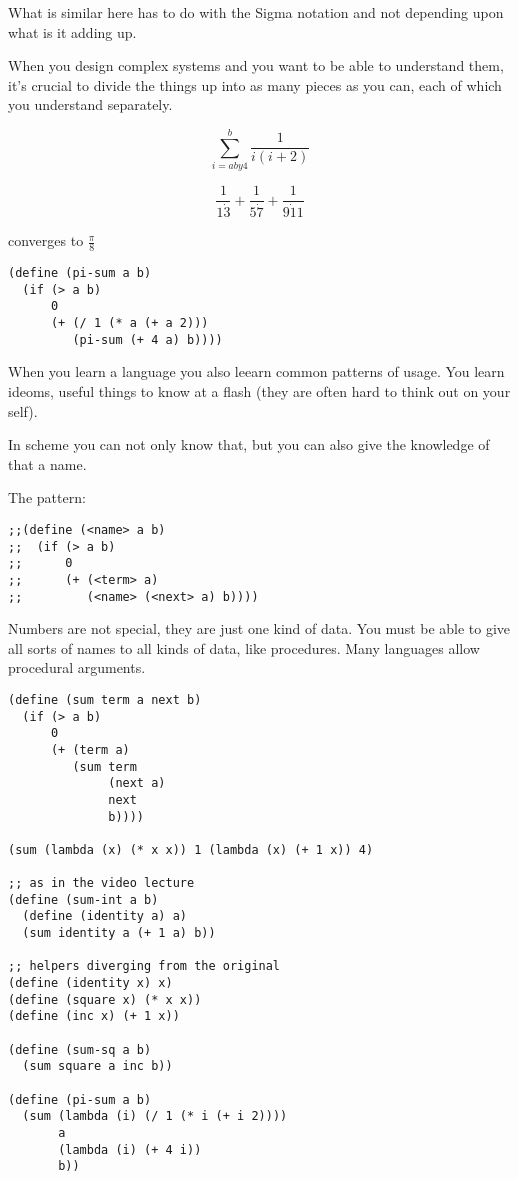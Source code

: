 \documentclass[11pt]{article}
\begin{document}
What is similar here has to do with the Sigma notation and not depending
upon what is it adding up.

When you design complex systems and you want to be able to understand them,
it's crucial to divide the things up into as many pieces as you can, each
of which you understand separately.

$$ \sum_{i=a by 4}^{b} \frac{1}{i(i + 2)} $$

$$ \frac{1}{1 \dot 3} + \frac{1}{5 \dot 7} + \frac{1}{9 \dot 11} $$

converges to \(\frac{\pi}{8}\) 

\begin{verbatim}
(define (pi-sum a b)
  (if (> a b)
      0
      (+ (/ 1 (* a (+ a 2)))
         (pi-sum (+ 4 a) b))))
\end{verbatim}

When you learn a language you also leearn common patterns of usage.
You learn ideoms, useful things to know at a flash (they are often hard
to think out on your self).

In scheme you can not only know that, but you can also give the knowledge
of that a name. 

The pattern:
\begin{verbatim}
;;(define (<name> a b)
;;  (if (> a b)
;;      0
;;      (+ (<term> a)
;;         (<name> (<next> a) b))))
\end{verbatim}

Numbers are not special, they are just one kind of data.
You must be able to give all sorts of names to all kinds of data,
like procedures. Many languages allow procedural arguments.

\begin{verbatim}
(define (sum term a next b)
  (if (> a b)
      0
      (+ (term a)
         (sum term
              (next a)
              next
              b))))

(sum (lambda (x) (* x x)) 1 (lambda (x) (+ 1 x)) 4)

;; as in the video lecture
(define (sum-int a b)
  (define (identity a) a)
  (sum identity a (+ 1 a) b))

;; helpers diverging from the original
(define (identity x) x)
(define (square x) (* x x))
(define (inc x) (+ 1 x))

(define (sum-sq a b)
  (sum square a inc b))

(define (pi-sum a b)
  (sum (lambda (i) (/ 1 (* i (+ i 2))))
       a
       (lambda (i) (+ 4 i))
       b))
\end{verbatim}
\end{document}
